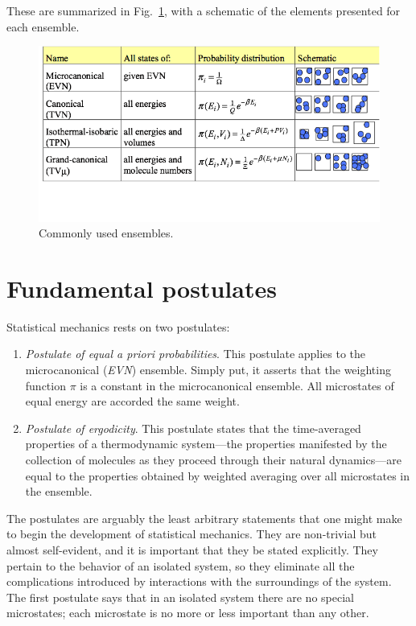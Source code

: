 \documentclass[9pt,bestpractices]{molsim}
\begin{document}
These are summarized in Fig.~\ref{fig:ensembles}, with a schematic of the elements
presented for each ensemble.

\begin{figure}
\includegraphics[width=\textwidth]{StatMech_figures/image003}
\caption{\label{fig:ensembles}Commonly used ensembles.}
\end{figure}


\section{Fundamental postulates}\label{postulates}

Statistical mechanics rests on two postulates:

\begin{enumerate}
\def\labelenumi{\arabic{enumi}.}
\item
  \emph{Postulate of equal \emph{a priori} probabilities}. This
  postulate applies to the microcanonical (\emph{EVN}) ensemble. Simply put, it
  asserts that the weighting function $\pi$ is a constant in the
  microcanonical ensemble. All microstates of equal energy are accorded
  the same weight.
\item
  \emph{Postulate of ergodicity}. This postulate states that the
  time-averaged properties of a thermodynamic system---the properties
  manifested by the collection of molecules as they proceed through
  their natural dynamics---are equal to the properties obtained by
  weighted averaging over all microstates in the ensemble.
\end{enumerate}

The postulates are arguably the least arbitrary statements that one
might make to begin the development of statistical mechanics. They are
non-trivial but almost self-evident, and it is important that they be
stated explicitly. They pertain to the behavior of an isolated system,
so they eliminate all the complications introduced by interactions with
the surroundings of the system. The first postulate says that in an
isolated system there are no special microstates; each microstate is no
more or less important than any other.
\end{document}
